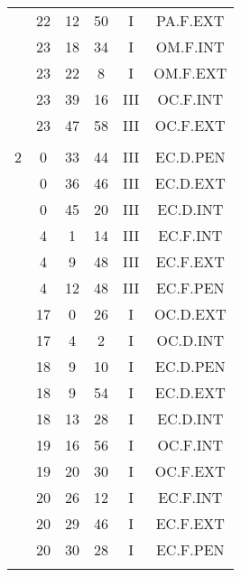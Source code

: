 \documentclass[12pt, a4paper]{article}
\begin{document}
\begin{multicols}{3}
{\begin{tabular}{c c c c c c}
	 	 	 	 & 22 & 12 & 50 & I & PA.F.EXT\\%
	 	 	 	 & 23 & 18 & 34 & I & OM.F.INT\\%
	 	 	 	 & 23 & 22 & 8 & I & OM.F.EXT\\%
	 	 	 	 & 23 & 39 & 16 & III & OC.F.INT\\%
	 	 	 	 & 23 & 47 & 58 & III & OC.F.EXT\\%
	 	 	 	 & & & & & \\%
	 	 	 	2 & 0 & 33 & 44 & III & EC.D.PEN\\%
	 	 	 	 & 0 & 36 & 46 & III & EC.D.EXT\\%
	 	 	 	 & 0 & 45 & 20 & III & EC.D.INT\\%
	 	 	 	 & 4 & 1 & 14 & III & EC.F.INT\\%
	 	 	 	 & 4 & 9 & 48 & III & EC.F.EXT\\%
	 	 	 	 & 4 & 12 & 48 & III & EC.F.PEN\\%
	 	 	 	 & 17 & 0 & 26 & I & OC.D.EXT\\%
	 	 	 	 & 17 & 4 & 2 & I & OC.D.INT\\%
	 	 	 	 & 18 & 9 & 10 & I & EC.D.PEN\\%
	 	 	 	 & 18 & 9 & 54 & I & EC.D.EXT\\%
	 	 	 	 & 18 & 13 & 28 & I & EC.D.INT\\%
	 	 	 	 & 19 & 16 & 56 & I & OC.F.INT\\%
	 	 	 	 & 19 & 20 & 30 & I & OC.F.EXT\\%
	 	 	 	 & 20 & 26 & 12 & I & EC.F.INT\\%
	 	 	 	 & 20 & 29 & 46 & I & EC.F.EXT\\%
	 	 	 	 & 20 & 30 & 28 & I & EC.F.PEN\\%
	 	 	 	 & & & & & \\%

\end{tabular}}
\end{multicols}
\end{document}
